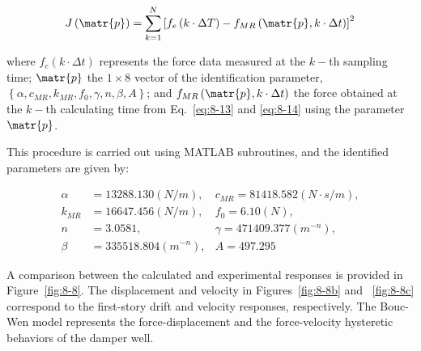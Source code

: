 \begin{equation}\label{eq:8-15}
J\left(\matr{p}\right) = \sum_{k=1}^{N}\left[f_{e}\left(k\cdot\Delta T \right) - f_{MR}\left(\matr{p}, k\cdot\Delta t \right)\right]^{2}
\end{equation}

where $f_{e}\left(k\cdot\Delta t\right)$ represents the force data measured at the $k-$th sampling time; $\matr{p}$ the $1\times8$ vector of the identification parameter, $\left\{ \alpha, c_{MR}, k_{MR}, f_{0}, \gamma, n, \beta, A \right\}$; and $f_{MR}\left(\matr{p},k\cdot\Delta t\right)$ the force obtained at the $k-$th calculating time from Eq.~\eqref{eq:8-13} and \eqref{eq:8-14} using the parameter $\matr{p}$.

This procedure is carried out using MATLAB subroutines\citep{coleman1999optimization}, and the identified parameters are given by:

\begin{equation}\label{eq:8-16}
\begin{aligned}
\alpha &=13288.130 (N/m), & c_{MR} = 81418.582 (N\cdot s/m), \\
k_{MR} &=16647.456 (N/m), & f_{0} = 6.10 (N), \\
n &= 3.0581, & \gamma = 471409.377 (m^{-n}),\\
\beta&=335518.804 (m^{-n}), & A=497.295
\end{aligned}
\end{equation}

A comparison between the calculated and experimental responses is provided in Figure~\ref{fig:8-8}. The displacement and velocity in Figures~\ref{fig:8-8b} and ~\ref{fig:8-8c} correspond to the first-story drift and velocity responses, respectively. The Bouc-Wen model represents the force-displacement and the force-velocity hysteretic behaviors of the damper well.

